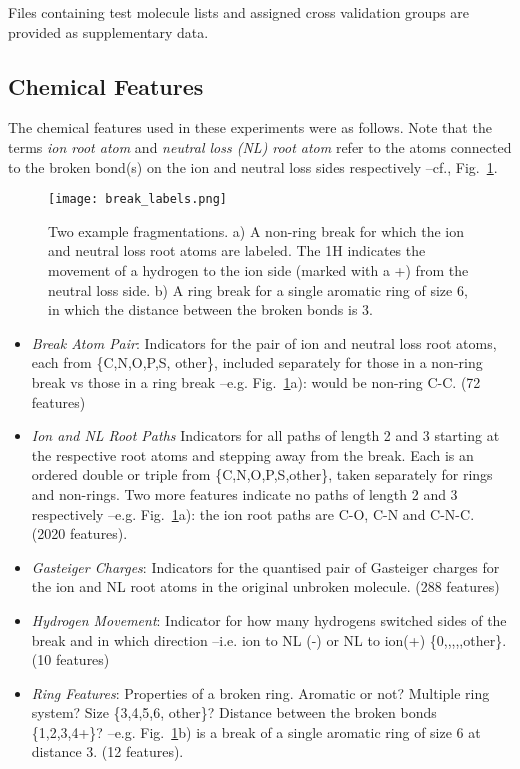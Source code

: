 Files containing test molecule lists and assigned cross validation groups are provided as supplementary data. 

\subsection{Chemical Features}
\label{sec:ChemicalFeatures}

The chemical features used in these experiments were as follows. 
Note that the terms \emph{ion root atom} and \emph{neutral loss (NL) root atom} refer to the atoms connected to the broken bond(s) on the ion and neutral loss sides respectively --cf., Fig.~\ref{fig:breakLabel}.
\begin{figure}[!tpb]
\begin{center}
\texttt{[image: break\_labels.png]}
\caption{Two example fragmentations. a) A non-ring break for which the ion and neutral loss root atoms are labeled. The 1H indicates the movement of a hydrogen to the ion side  (marked with a +) from the neutral loss side. b) A ring break for a single aromatic ring of size 6, in which the distance between the broken bonds is 3.  }
\label{fig:breakLabel}
\end{center}
\vspace{-2em}
\end{figure}
\begin{itemize}
\item \emph{Break Atom Pair}: Indicators for the pair of ion and neutral loss root atoms, each from \{C,N,O,P,S, other\}, included separately for those in a non-ring break vs those in a ring break --e.g. Fig.~\ref{fig:breakLabel}a): would be non-ring C-C. (72 features)
\item \emph{Ion and NL Root Paths} Indicators for all paths of length 2 and 3 starting at the respective root atoms and stepping away from the break. Each is an ordered double or triple from \{C,N,O,P,S,other\}, taken separately for rings and non-rings. Two more features indicate no paths of length 2 and 3 respectively --e.g. Fig.~\ref{fig:breakLabel}a): the ion root paths are C-O, C-N and C-N-C. (2020 features).
\item \emph{Gasteiger Charges}: Indicators for the quantised pair of Gasteiger charges \citep{Gasteiger1980} for the ion and NL root atoms in the original unbroken molecule. (288 features)
\item \emph{Hydrogen Movement}: Indicator for how many hydrogens switched sides of the break and in which direction --i.e. ion to NL (-) or NL to ion(+) \{0,,,,,other\}. (10 features)
\item \emph{Ring Features}: Properties of a broken ring. Aromatic or not? Multiple ring system? Size \{3,4,5,6, other\}? Distance between the broken bonds \{1,2,3,4+\}? --e.g. Fig.~\ref{fig:breakLabel}b) is a break of a single aromatic ring of size 6 at distance 3. (12 features).
\end{itemize}

